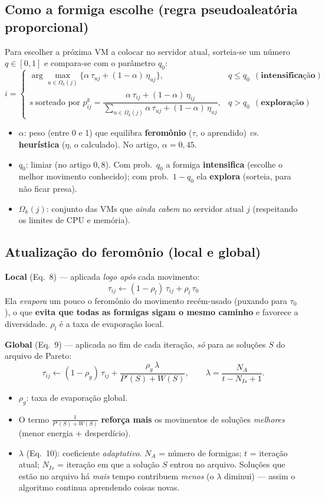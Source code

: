\documentclass[11pt]{article}
\newcommand{\var}[1]{\textcolor{azul}{$#1$}}
\begin{document}
\subsection{Como a formiga escolhe (regra pseudoaleatória proporcional)}
Para escolher a próxima VM a colocar no servidor atual, sorteia-se um número
$q\in[0,1]$ e compara-se com o parâmetro \var{q_0}:
\[
i=\begin{cases}
\displaystyle\arg\max_{u\in\Omega_k(j)}\big\{\alpha\,\tau_{uj}+(1-\alpha)\,\eta_{uj}\big\}, & q\le q_0\ \ (\textbf{intensificação})\\[8pt]
s\ \text{sorteado por } p^k_{ij}=\dfrac{\alpha\,\tau_{ij}+(1-\alpha)\,\eta_{ij}}{\sum_{u\in\Omega_k(j)}\alpha\,\tau_{uj}+(1-\alpha)\,\eta_{uj}}, & q>q_0\ \ (\textbf{exploração})
\end{cases}
\]
\begin{itemize}[leftmargin=1.4em,itemsep=1pt]
  \item \var{\alpha}: peso (entre 0 e 1) que equilibra \textbf{feromônio} ($\tau$,
  o aprendido) \emph{vs.} \textbf{heurística} ($\eta$, o calculado). No artigo,
  $\alpha=0{,}45$.
  \item \var{q_0}: limiar (no artigo $0{,}8$). Com prob.\ $q_0$ a formiga
  \textbf{intensifica} (escolhe o melhor movimento conhecido); com prob.\ $1-q_0$
  ela \textbf{explora} (sorteia, para não ficar presa).
  \item \var{\Omega_k(j)}: conjunto das VMs que \emph{ainda cabem} no servidor
  atual $j$ (respeitando os limites de CPU e memória).
\end{itemize}

\subsection{Atualização do feromônio (local e global)}
\textbf{Local} (Eq.~8) --- aplicada \emph{logo após} cada movimento:
\[
\tau_{ij}\leftarrow(1-\rho_l)\,\tau_{ij}+\rho_l\,\tau_0
\]
Ela \emph{evapora} um pouco o feromônio do movimento recém-usado (puxando para
$\tau_0$), o que \textbf{evita que todas as formigas sigam o mesmo caminho} e
favorece a diversidade. \var{\rho_l} é a taxa de evaporação local.

\textbf{Global} (Eq.~9) --- aplicada ao fim de cada iteração, \emph{só} para as
soluções $S$ do arquivo de Pareto:
\[
\tau_{ij}\leftarrow(1-\rho_g)\,\tau_{ij}+\frac{\rho_g\,\lambda}{P'(S)+W(S)},
\qquad \lambda=\frac{N_A}{t-N_{Is}+1}.
\]
\begin{itemize}[leftmargin=1.4em,itemsep=1pt]
  \item \var{\rho_g}: taxa de evaporação global.
  \item O termo $\frac{1}{P'(S)+W(S)}$ \textbf{reforça mais} os movimentos de
  soluções \emph{melhores} (menor energia + desperdício).
  \item \var{\lambda} (Eq.~10): coeficiente \emph{adaptativo}. \var{N_A} = número
  de formigas; \var{t} = iteração atual; \var{N_{Is}} = iteração em que a solução
  $S$ entrou no arquivo. Soluções que estão no arquivo há \emph{mais} tempo
  contribuem \emph{menos} (o $\lambda$ diminui) — assim o algoritmo continua
  aprendendo coisas novas.
\end{itemize}
\end{document}
